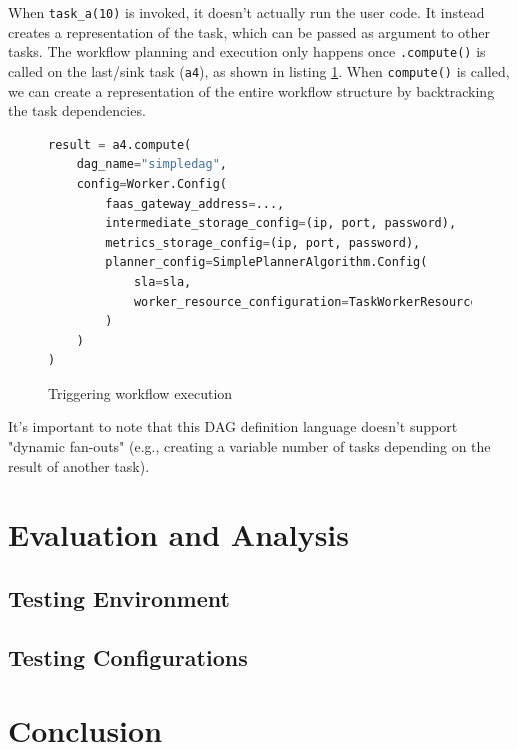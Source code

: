 \documentclass[conference]{IEEEtran}
\begin{document}
When \texttt{task\_a(10)} is invoked, it doesn't actually run the user code. It instead creates a representation of the task, which can be passed as argument to other tasks. The workflow planning and execution only happens once \texttt{.compute()} is called on the last/sink task (\texttt{a4}), as shown in listing \ref{lst:triggering_workflow_execution}. When \texttt{compute()} is called, we can create a representation of the entire workflow structure by backtracking the task dependencies.

\begin{figure}[h]
\centering
\begin{lstlisting}[language=Python, basicstyle=\ttfamily\footnotesize, columns=fullflexible, breaklines=true]
result = a4.compute(
    dag_name="simpledag", 
    config=Worker.Config(
        faas_gateway_address=...,
        intermediate_storage_config=(ip, port, password),
        metrics_storage_config=(ip, port, password),
        planner_config=SimplePlannerAlgorithm.Config(
            sla=sla,
            worker_resource_configuration=TaskWorkerResourceConfiguration(cpus=3, memory_mb=512),
        )
    )
)
\end{lstlisting}
\caption{Triggering workflow execution}
\label{lst:triggering_workflow_execution}
\end{figure}

It's important to note that this DAG definition language doesn't support "dynamic fan-outs" (e.g., creating a variable number of tasks depending on the result of another task).


\section{Evaluation and Analysis}

\subsection{Testing Environment}
\subsection{Testing Configurations}

\section{Conclusion}



\end{document}
